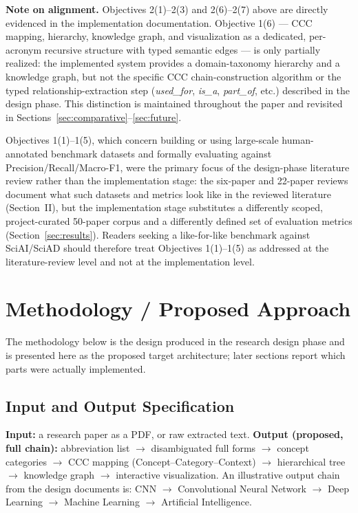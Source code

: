 \documentclass[10pt,conference]{IEEEtran}
\begin{document}
\textbf{Note on alignment.} Objectives 2(1)--2(3) and 2(6)--2(7) above are directly evidenced in the implementation documentation. Objective 1(6) --- CCC mapping, hierarchy, knowledge graph, and visualization as a dedicated, per-acronym recursive structure with typed semantic edges --- is only partially realized: the implemented system provides a domain-taxonomy hierarchy and a knowledge graph, but not the specific CCC chain-construction algorithm or the typed relationship-extraction step (\textit{used\_for}, \textit{is\_a}, \textit{part\_of}, etc.) described in the design phase. This distinction is maintained throughout the paper and revisited in Sections~\ref{sec:comparative}--\ref{sec:future}.

Objectives 1(1)--1(5), which concern building or using large-scale human-annotated benchmark datasets and formally evaluating against Precision/Recall/Macro-F1, were the primary focus of the design-phase literature review rather than the implementation stage: the six-paper and 22-paper reviews document what such datasets and metrics look like in the reviewed literature (Section~II), but the implementation stage substitutes a differently scoped, project-curated 50-paper corpus and a differently defined set of evaluation metrics (Section~\ref{sec:results}). Readers seeking a like-for-like benchmark against SciAI/SciAD should therefore treat Objectives 1(1)--1(5) as addressed at the literature-review level and not at the implementation level.

\section{Methodology / Proposed Approach}
\label{sec:methodology}
The methodology below is the design produced in the research design phase and is presented here as the proposed target architecture; later sections report which parts were actually implemented.

\subsection{Input and Output Specification}
\textbf{Input:} a research paper as a PDF, or raw extracted text. \textbf{Output (proposed, full chain):} abbreviation list $\rightarrow$ disambiguated full forms $\rightarrow$ concept categories $\rightarrow$ CCC mapping (Concept--Category--Context) $\rightarrow$ hierarchical tree $\rightarrow$ knowledge graph $\rightarrow$ interactive visualization. An illustrative output chain from the design documents is: CNN $\rightarrow$ Convolutional Neural Network $\rightarrow$ Deep Learning $\rightarrow$ Machine Learning $\rightarrow$ Artificial Intelligence.
\end{document}
